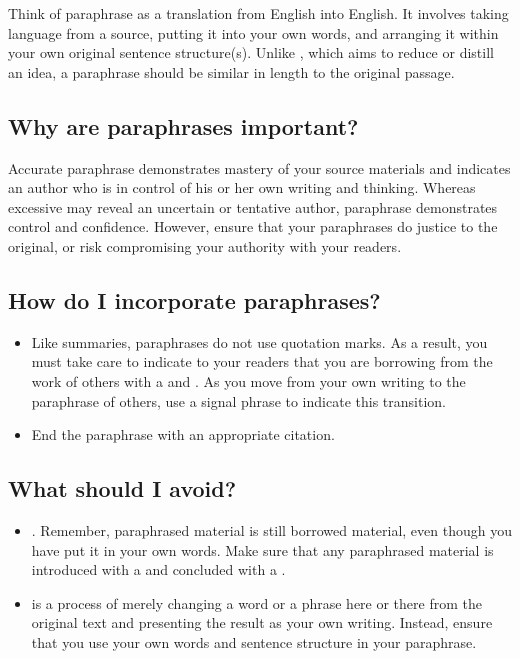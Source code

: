 Think of paraphrase as a translation from English into English. It involves
taking
language from a source, putting it into your own words, and arranging it within
your own original
sentence structure(s). Unlike \hyperlink{summary}{\color{Ahrenge}{summary}}, which aims to reduce or distill an
idea, a paraphrase should
be similar in length to the original passage.

\subsection{Why are paraphrases important?}

Accurate paraphrase demonstrates mastery of your source materials and
indicates an author who is in control of his or her own writing and thinking. Whereas excessive
\hyperlink{quotation}{\color{Ahrenge}{quotation}} may reveal an uncertain or tentative author, paraphrase demonstrates control and
confidence. However, ensure that your paraphrases do justice to the original, or risk compromising
your authority with your readers.

\subsection{How do I incorporate paraphrases?}

\begin{itemize}
\item Like summaries, paraphrases do not use quotation marks. As a result,
you must take care to indicate to your readers that you are borrowing from
the work of others with a \hyperlink{signalphrase}{\color{Ahrenge}{signal phrase}} and \hyperlink{citation}{\color{Ahrenge}{citation}}. As you move
from your own writing to the paraphrase of others, use a signal phrase to
indicate this transition.

\item End the paraphrase with an appropriate citation.

\end{itemize}

\subsection {What should I avoid?}

\begin{itemize}

\item {}. Remember, paraphrased material
is still borrowed material, even though you have put it in your own words. Make sure that any paraphrased material is introduced with a \hyperlink{signalphrase}{\color{Ahrenge}{signal phrase}} and concluded with a \hyperlink{citation}{\color{Ahrenge}{citation}}.

\item {} \hyperlink{patchwriting}{\color{Ahrenge}{Patchwriting}} is a process of merely changing a word or a phrase here or there from the original text and presenting the result as your own writing. Instead, ensure that you use your own words and sentence structure in your paraphrase.
\end{itemize}

